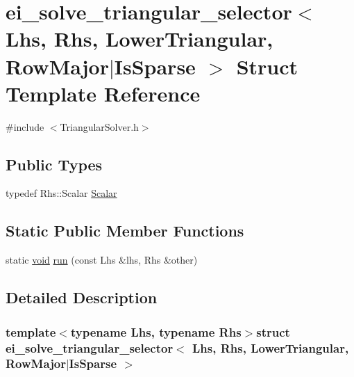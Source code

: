 \hypertarget{structei__solve__triangular__selector_3_01_lhs_00_01_rhs_00_01_lower_triangular_00_01_row_major_7_is_sparse_01_4}{\section{ei\-\_\-solve\-\_\-triangular\-\_\-selector$<$ Lhs, Rhs, Lower\-Triangular, Row\-Major$|$\-Is\-Sparse $>$ Struct Template Reference}
\label{structei__solve__triangular__selector_3_01_lhs_00_01_rhs_00_01_lower_triangular_00_01_row_major_7_is_sparse_01_4}
}


{\ttfamily \#include $<$Triangular\-Solver.\-h$>$}

\subsection*{Public Types}
\begin{DoxyCompactItemize}
\item 
typedef Rhs\-::\-Scalar \hyperlink{structei__solve__triangular__selector_3_01_lhs_00_01_rhs_00_01_lower_triangular_00_01_row_major_7_is_sparse_01_4_a9c48229c1b5c03d130c36c3c2246d68e}{Scalar}
\end{DoxyCompactItemize}
\subsection*{Static Public Member Functions}
\begin{DoxyCompactItemize}
\item 
static \hyperlink{group___u_a_v_objects_plugin_ga444cf2ff3f0ecbe028adce838d373f5c}{void} \hyperlink{structei__solve__triangular__selector_3_01_lhs_00_01_rhs_00_01_lower_triangular_00_01_row_major_7_is_sparse_01_4_a2cc503f2e33fc05ff93d7043c96eef66}{run} (const Lhs \&lhs, Rhs \&other)
\end{DoxyCompactItemize}


\subsection{Detailed Description}
\subsubsection*{template$<$typename Lhs, typename Rhs$>$struct ei\-\_\-solve\-\_\-triangular\-\_\-selector$<$ Lhs, Rhs, Lower\-Triangular, Row\-Major$|$\-Is\-Sparse $>$}



